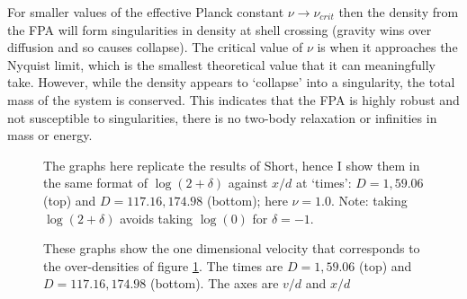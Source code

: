 For smaller values of the effective Planck constant $\nu \rightarrow \nu_{crit}$ then the density from the FPA will form singularities in density at shell crossing (gravity wins over diffusion and so causes collapse). The critical value of $\nu$ is when it approaches the Nyquist limit, which is the smallest theoretical value that it can meaningfully take. However, while the density appears to `collapse' into a singularity, the total mass of the system is conserved. This indicates that the FPA is highly robust and not susceptible to singularities, there is no two-body relaxation or infinities in mass or energy.

\begin{figure}[htb]
   \begin{center}
     \leavevmode %
                \epsfxsize=80mm
                 \nolinebreak
      		\epsfxsize=80mm

                \epsfxsize=80mm
                 \nolinebreak
      		\epsfxsize=80mm

   \end{center}
\caption{The graphs here replicate the results of Short, hence I show them in the same format of $\log(2+\delta)$ against $x/d$ at `times': $D=1, 59.06$ (top) and  $D=117.16, 174.98$ (bottom); here $\nu=1.0$. Note: taking $\log(2+\delta)$ avoids taking $\log(0)$ for $\delta=-1$.}
\label{fig.den}
\end{figure} 



\begin{figure}[htb]
   \begin{center}
     \leavevmode %
                \epsfxsize=80mm
                 \nolinebreak
      		\epsfxsize=80mm

                \epsfxsize=80mm
                 \nolinebreak
      		\epsfxsize=80mm

   \end{center}
\caption{These graphs show the one dimensional velocity that corresponds to the over-densities of figure \ref{fig.den}. The times are $D=1, 59.06$ (top) and $D=117.16, 174.98 $ (bottom). The axes are $v/d$ and $x/d$}
\label{fig.vel}
\end{figure} 

